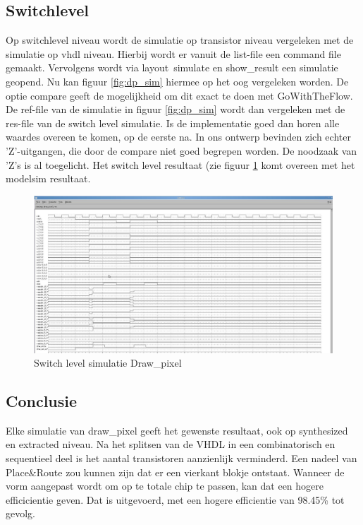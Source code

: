 \documentclass{scrartcl} %
\begin{document}
\subsection{Switchlevel}
Op switchlevel niveau wordt de simulatie op transistor niveau vergeleken met de simulatie op vhdl niveau. Hierbij wordt er vanuit de list-file een command file gemaakt. Vervolgens wordt via layout\ simulate en show\_result een simulatie geopend. Nu kan figuur \ref{fig:dp_sim} hiermee op het oog vergeleken worden. De optie compare geeft de mogelijkheid om dit exact te doen met GoWithTheFlow. De ref-file van de simulatie in figuur \ref{fig:dp_sim} wordt dan vergeleken met de res-file van de switch level simulatie. Is de implementatie goed dan horen alle waardes overeen te komen, op de eerste na. In ons ontwerp bevinden zich echter 'Z'-uitgangen, die door de compare niet goed begrepen worden. De noodzaak van 'Z's is al toegelicht. Het switch level resultaat (zie figuur \ref{fig:dp_sw_lev} komt overeen met het modelsim resultaat.
\begin{figure} [h!]
\centering
\includegraphics [width = \textwidth] {resource/dp_sw_lev-rc}
\caption{Switch level simulatie Draw\_pixel}
\label{fig:dp_sw_lev}
\end{figure}



\subsection{Conclusie}
Elke simulatie van draw\_pixel geeft het gewenste resultaat, ook op synthesized en extracted niveau. Na het splitsen van de VHDL in een combinatorisch en sequentieel deel is het aantal transistoren aanzienlijk verminderd. Een nadeel van Place\&Route zou kunnen zijn dat er een vierkant blokje ontstaat. Wanneer de vorm aangepast wordt om op te totale chip te passen, kan dat een hogere efficicientie geven. Dat is uitgevoerd, met een hogere efficientie van 98.45\% tot gevolg. 
\end{document}
